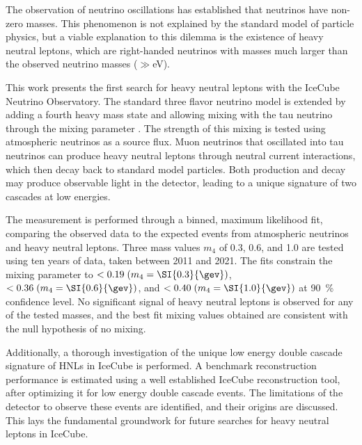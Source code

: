 The observation of neutrino oscillations has established that neutrinos have non-zero masses. This phenomenon is not explained by the standard model of particle physics, but a viable explanation to this dilemma is the existence of heavy neutral leptons, which are right-handed neutrinos with masses much larger than the observed neutrino masses ($\gg$\si{\electronvolt}).

This work presents the first search for heavy neutral leptons with the IceCube Neutrino Observatory. The standard three flavor neutrino model is extended by adding a fourth heavy mass state and allowing mixing with the tau neutrino through the mixing parameter . The strength of this mixing is tested using atmospheric neutrinos as a source flux. Muon neutrinos that oscillated into tau neutrinos can produce heavy neutral leptons through neutral current interactions, which then decay back to standard model particles. Both production and decay may produce observable light in the detector, leading to a unique signature of two cascades at low energies.

The measurement is performed through a binned, maximum likelihood fit, comparing the observed data to the expected events from atmospheric neutrinos and heavy neutral leptons. Three mass values $m_4$ of \SI{0.3}{\gev}, \SI{0.6}{\gev}, and \SI{1.0}{\gev} are tested using ten years of data, taken between 2011 and 2021. The fits constrain the mixing parameter to $ < 0.19\;(m_4 = \SI{0.3}{\gev})$, $ < 0.36\;(m_4 = \SI{0.6}{\gev})$, and $ < 0.40\;(m_4 = \SI{1.0}{\gev})$ at \SI{90}{\percent} confidence level. No significant signal of heavy neutral leptons is observed for any of the tested masses, and the best fit mixing values obtained are consistent with the null hypothesis of no mixing.

Additionally, a thorough investigation of the unique low energy double cascade signature of HNLs in IceCube is performed. A benchmark reconstruction performance is estimated using a well established IceCube reconstruction tool, after optimizing it for low energy double cascade events. The limitations of the detector to observe these events are identified, and their origins are discussed. This lays the fundamental groundwork for future searches for heavy neutral leptons in IceCube.

